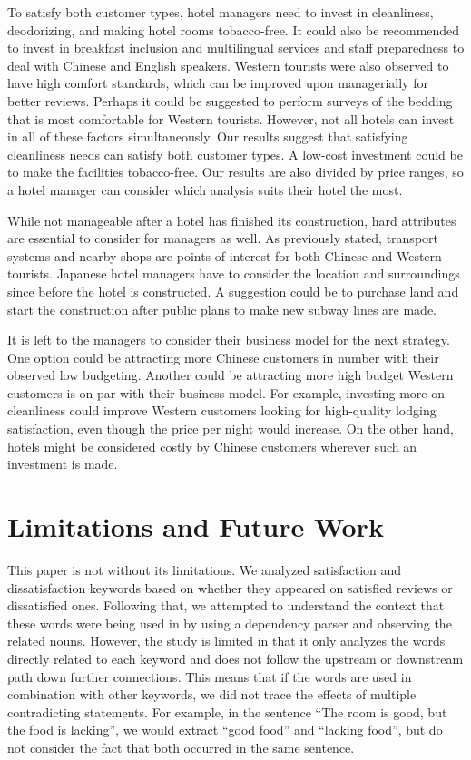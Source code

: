 \documentclass[smallextended,natbib]{svjour3}       %
\begin{document}
    To satisfy both customer types, hotel managers need to invest in cleanliness, deodorizing, and making hotel rooms tobacco-free. It could also be recommended to invest in breakfast inclusion and multilingual services and staff preparedness to deal with Chinese and English speakers. Western tourists were also observed to have high comfort standards, which can be improved upon managerially for better reviews. Perhaps it could be suggested to perform surveys of the bedding that is most comfortable for Western tourists. However, not all hotels can invest in all of these factors simultaneously. Our results suggest that satisfying cleanliness needs can satisfy both customer types. A low-cost investment could be to make the facilities tobacco-free. Our results are also divided by price ranges, so a hotel manager can consider which analysis suits their hotel the most.

    While not manageable after a hotel has finished its construction, hard attributes are essential to consider for managers as well. As previously stated, transport systems and nearby shops are points of interest for both Chinese and Western tourists. Japanese hotel managers have to consider the location and surroundings since before the hotel is constructed. A suggestion could be to purchase land and start the construction after public plans to make new subway lines are made. 

    It is left to the managers to consider their business model for the next strategy. One option could be attracting more Chinese customers in number with their observed low budgeting. Another could be attracting more high budget Western customers is on par with their business model. For example, investing more on cleanliness could improve Western customers looking for high-quality lodging satisfaction, even though the price per night would increase. On the other hand, hotels might be considered costly by Chinese customers wherever such an investment is made.

\section{Limitations and Future Work}\label{limitations}

  This paper is not without its limitations. We analyzed satisfaction and dissatisfaction keywords based on whether they appeared on satisfied reviews or dissatisfied ones. Following that, we attempted to understand the context that these words were being used in by using a dependency parser and observing the related nouns. However, the study is limited in that it only analyzes the words directly related to each keyword and does not follow the upstream or downstream path down further connections. This means that if the words are used in combination with other keywords, we did not trace the effects of multiple contradicting statements. For example, in the sentence ``The room is good, but the food is lacking'', we would extract ``good food'' and ``lacking food'', but do not consider the fact that both occurred in the same sentence.
\end{document}
